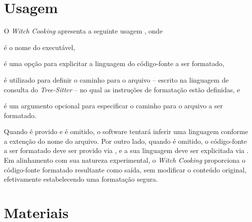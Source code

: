 \documentclass
  [11pt,a4paper,english,brazil,openright,sumario=tradicional,twoside]
  {abntex2}
\newcommand{\treesitter}{\textit{Tree-Sitter}\xspace}
\newcommand{\witchcooking}{\textit{Witch Cooking}\xspace}
\begin{document}
  \section{Usagem}
  \label{section:usage}

  O \witchcooking apresenta a seguinte usagem
  , onde
  \begin{inparaenum}
    \item {} é o nome do executável,
    \item \codesnippetinline{[-l LANG]} é uma opção para explicitar a linguagem
          do código-fonte a ser formatado,
    \item {} é utilizado para definir o caminho para
          o arquivo -- escrito na linguagem de consulta do \treesitter{} -- no
          qual as instruções de formatação estão definidas, e
    \item \codesnippetinline{[SRC]} é um argumento opcional para especificar o
          caminho para o arquivo a ser formatado.
  \end{inparaenum}
  Quando \codesnippetinline{[SRC]} é provido e \codesnippetinline{[-l LANG]} é
  omitido, o software tentará inferir uma linguagem conforme a extenção do nome
  do arquivo. Por outro lado, quando \codesnippetinline{[SRC]} é omitido, o
  código-fonte a ser formatado deve ser provido via \textit{},
  e a sua linguagem deve ser explicitada via \codesnippetinline{[-l LANG]}. Em
  alinhamento com sua natureza experimental, o \witchcooking proporciona o
  código-fonte formatado resultante como saída, sem modificar o conteúdo
  original, efetivamente estabelecendo uma formatação segura.

  \section{Materiais}
\end{document}
